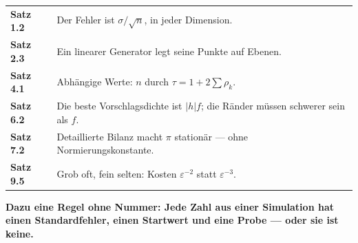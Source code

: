 \begin{merksatz}
\begin{center}
{\small
\renewcommand{\arraystretch}{1.5}
\begin{tabular}{@{}P{2.0cm}P{6.6cm}@{}}
\toprule
\textbf{Satz 1.2} & Der Fehler ist $\sigma/\sqrt n$, in jeder Dimension.\\
\textbf{Satz 2.3} & Ein linearer Generator legt seine Punkte auf Ebenen.\\
\textbf{Satz 4.1} & Abhängige Werte: $n$ durch $\tau = 1+2\sum\rho_k$.\\
\textbf{Satz 6.2} & Die beste Vorschlagsdichte ist $|h|f$; die Ränder müssen schwerer sein als $f$.\\
\textbf{Satz 7.2} & Detaillierte Bilanz macht $\pi$ stationär --- ohne Normierungskonstante.\\
\textbf{Satz 9.5} & Grob oft, fein selten: Kosten $\varepsilon^{-2}$ statt $\varepsilon^{-3}$.\\
\bottomrule
\end{tabular}}
\end{center}

\begin{center}
\begin{minipage}{0.9\textwidth}
\textbf{Dazu eine Regel ohne Nummer: Jede Zahl aus einer Simulation hat einen Standardfehler, einen Startwert und eine Probe --- oder sie ist keine.}
\end{minipage}
\end{center}
\end{merksatz}

\begin{merksatz}
\begin{center}
\begin{minipage}{0.9\textwidth}
\end{minipage}
\end{center}
\end{merksatz}
